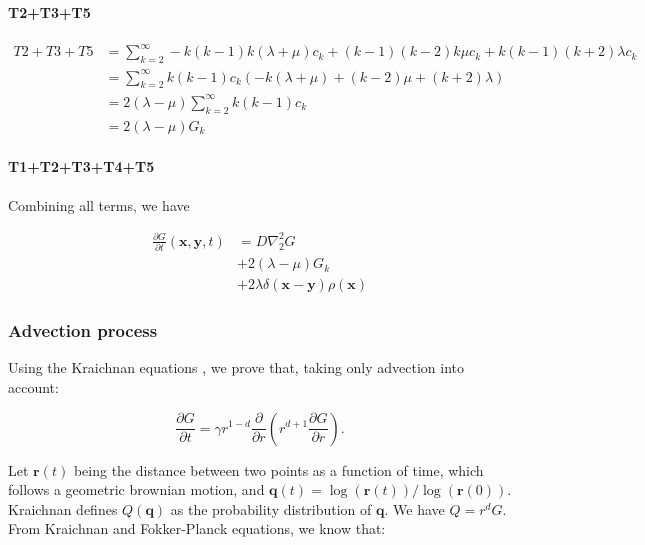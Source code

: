 \paragraph*{T2+T3+T5}

\begin{subequations}

\begin{align}
T2+T3+T5 & =\sum_{k=2}^{\infty}-k(k-1)k(\lambda+\mu)c_{k}+(k-1)(k-2)k\mu c_{k}+k(k-1)(k+2)\lambda c_{k}\label{la-1-1}\\
 & =\sum_{k=2}^{\infty}k(k-1)c_{k}(-k(\lambda+\mu)+(k-2)\mu+(k+2)\lambda)\\
 & =2(\lambda-\mu)\sum_{k=2}^{\infty}k(k-1)c_{k}\\
 & =2(\lambda-\mu)G_{k}
\end{align}

\end{subequations}

\paragraph*{T1+T2+T3+T4+T5}

Combining all terms, we have

\begin{subequations} 
\begin{align}
\frac{\partial G}{\partial t}(\boldsymbol{x},\boldsymbol{y},t) & =D\nabla_{2}^{2}G \label{nk_diffusion-1}\\
 & +2(\lambda-\mu)G_{k} \label{nk_same_state-1}\\
 & +2\lambda\delta(\boldsymbol{x}-\boldsymbol{y})\rho(\boldsymbol{x}) \label{nk_death-1}
\end{align}
\end{subequations}

\subsubsection*{Advection process}

Using the Kraichnan equations \cite{kraichnan_convection_1974}, we prove that, taking only advection into account:

\begin{equation}
\frac{\partial G}{\partial t}=\gamma r^{1-d}\frac{\partial}{\partial r}\left(r^{d+1}\frac{\partial G}{\partial r}\right). \label{eq:eq_2_Young_advection}
\end{equation}

Let $\boldsymbol{r}(t)$
being the distance between two points as a function of time, which follows a geometric brownian motion, and $\boldsymbol{q}(t)=\log(\boldsymbol{r}(t))/\log(\boldsymbol{r}(0))$.
Kraichnan defines $Q(\boldsymbol{q})$ as the probability distribution
of $\boldsymbol{q}$. We have $Q=r^{d}G$. From Kraichnan and Fokker-Planck equations, we know that:

